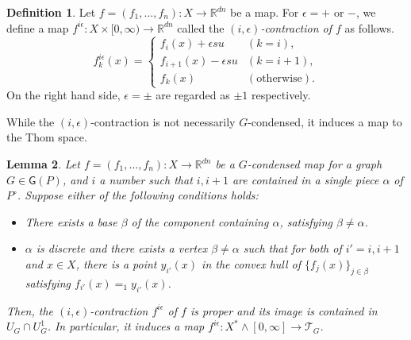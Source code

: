\documentclass[reqno]{amsart}
\theoremstyle{definition}
\newtheorem{defi}{Definition}[section]
\theoremstyle{plain}
\newtheorem{lem}[defi]{Lemma}
\newcommand{\eps}{\epsilon}
\newcommand{\TT}{\mathcal{T}} %
\newcommand{\GG}{\mathsf{G}}%
\newcommand{\RR}{\mathbb{R}}
\begin{document}
\begin{defi}\label{Di-cont}
Let $f=(f_1,\dots, f_n):X\to\RR^{dn}$ be a map.
For $\eps=+$ or $-$, we define a map $f^{i\eps}:X\times [0,\infty)\to \RR^{dn}$ called the {\em $(i,\eps)$-contraction of $f$} as follows.
\[
f^{i\eps}_k(x)=
\left\{
\begin{array}{cl}
f_i(x)+\eps s u &(k=i), \\
f_{i+1}(x)-\eps su &(k=i+1), \\
f_k(x) & (\text{otherwise}).
\end{array}\right.
\]
On the right hand side,  $\eps=\pm$ are regarded as $\pm 1$ respectively.

\end{defi}
While the $(i,\eps)$-contraction is not necessarily $G$-condensed, it induces a map to the Thom space.
\begin{lem}\label{Li-cont}
Let $f=(f_1,\dots, f_n):X\to \RR^{dn}$ be a $G$-condensed map for a graph $G\in\GG(P)$,  and $i$ a number such that  $i, i+1$ are contained in a single piece $\alpha$ of $P^\circ$.  Suppose either of the following conditions holds: 
\begin{itemize}

\item  There exists a base $\beta$ of the component containing $\alpha$, satisfying $\beta\not=\alpha$.
\item  $\alpha$ is discrete and there exists a vertex $\beta\not=\alpha$ such that for both of  $i'=i,i+1$ and $x\in X$,  there is a point $y_{i'}(x)$ in the convex hull of $\{f_j(x)\}_{j\in\beta}$ satisfying  $f_{i'}(x)=_1y_{i'}(x)$.  
\end{itemize}
Then, the $(i,\eps)$-contraction $f^{i\eps}$ of $f$ is proper and its image is contained in  $U_{G}\cap U^1_{G}$. In particular, it induces a map $f^{i\eps}:X^*\wedge[0,\infty]\to \TT_G$.


\end{lem}
\end{document}
